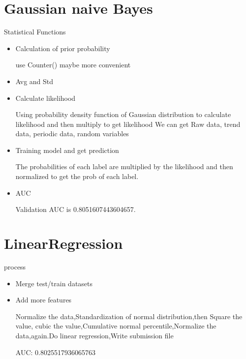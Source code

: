 \documentclass[
 size=12pt,
 paper=smartboard, %
 mode=present, %
 display=slides, %
style=tuliplab,
pauseslide,
fleqn,leqno]{powerdot}
\begin{document}
\section{Gaussian naive Bayes }
\begin{slide}{Statistical Functions}
\begin{itemize}[type=1]
\item Calculation of prior probability
\par
use Counter() maybe more convenient
\par
\item Avg and Std
\par
\item Calculate likelihood
\par
Using probability density function of Gaussian distribution to calculate likelihood and then multiply to get likelihood
We can get Raw data, trend data, periodic data, random variables
\par
\item Training model and get prediction
\par
The probabilities of each label are multiplied by the likelihood and then normalized to get the prob of each label.
\item AUC
\par
Validation AUC is 0.8051607443604657.
\end{itemize}
\end{slide}




\section{LinearRegression}
\begin{slide}{process}
\begin{itemize}
\item Merge test/train datasets
\par
\item Add more features
\par
Normalize the data,Standardization of normal distribution,then Square the value, cubic the value,Cumulative normal percentile,Normalize the data,again.Do linear regression,Write submission file
\par
AUC:  0.8025517936065763
\end{itemize}
\end{slide}
\end{document}
